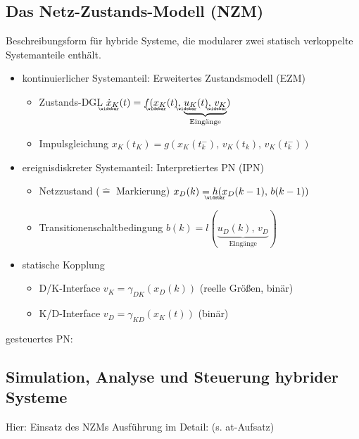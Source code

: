 \subsection{Das Netz-Zustands-Modell (NZM)}
Beschreibungsform für hybride Systeme, die modularer zwei statisch verkoppelte Systemanteile enthält.

\begin{itemize}
	\item kontinuierlicher Systemanteil: Erweitertes Zustandsmodell (EZM)
	\begin{itemize}
		\item Zustands-DGL $\wbar{\dot{x}}_K(t) = f(\wbar{x}_K(t),\,\underbrace{\wbar{u}_K(t),\,\wbar{v}_K}_{\text{Eingänge}})$
		\item Impulsgleichung $x_K(t_K) = g(x_K(t_k^-),\,v_K(t_k),\,v_K(t_k^-))$
	\end{itemize}
	\item ereignisdiskreter Systemanteil: Interpretiertes PN (IPN)
	\begin{itemize}
		\item Netzzustand ($\hat{=}$ Markierung) $x_D(k) = \wbar{h}(x_D(k-1),\,b(k-1))$
		\item Transitionenschaltbedingung $b(k) = l(\underbrace{u_D(k),\,v_D}_\text{Eingänge})$
	\end{itemize}
	\item statische Kopplung
	\begin{itemize}
		\item D/K-Interface $v_K = \gamma_{DK}(x_D(k))$ (reelle Größen, binär)
		\item K/D-Interface $v_D = \gamma_{KD}(x_K(t))$ (binär)
	\end{itemize}
\end{itemize}

gesteuertes PN: 

\subsection{Simulation, Analyse und Steuerung hybrider Systeme}
Hier: Einsatz des NZMs
Ausführung im Detail: (s. at-Aufsatz)

